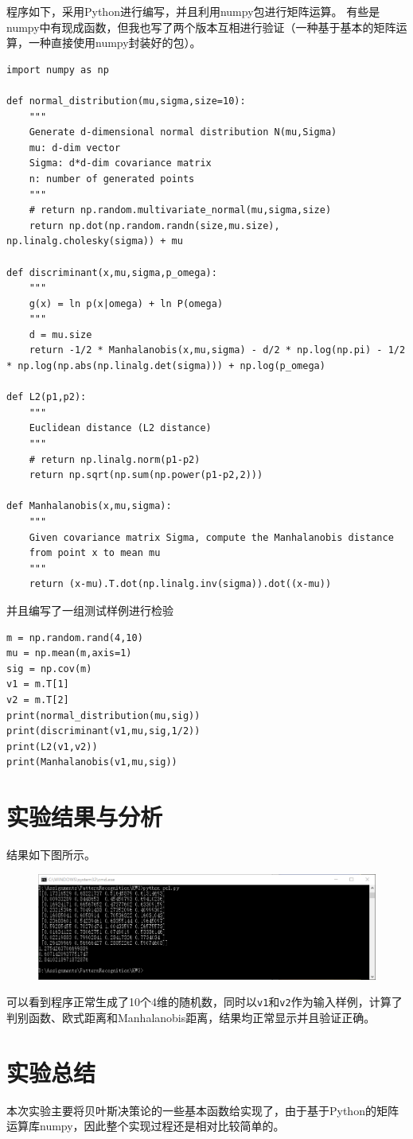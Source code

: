 \documentclass[reportComp]{thesis}
\begin{document}
程序如下，采用Python进行编写，并且利用numpy包进行矩阵运算。
有些是numpy中有现成函数，但我也写了两个版本互相进行验证（一种基于基本的矩阵运算，一种直接使用numpy封装好的包）。
\begin{lstlisting}
import numpy as np

def normal_distribution(mu,sigma,size=10):
	"""
	Generate d-dimensional normal distribution N(mu,Sigma)
	mu: d-dim vector
	Sigma: d*d-dim covariance matrix
	n: number of generated points
	"""
	# return np.random.multivariate_normal(mu,sigma,size)
	return np.dot(np.random.randn(size,mu.size), np.linalg.cholesky(sigma)) + mu

def discriminant(x,mu,sigma,p_omega):
	"""
	g(x) = ln p(x|omega) + ln P(omega)
	"""
	d = mu.size
	return -1/2 * Manhalanobis(x,mu,sigma) - d/2 * np.log(np.pi) - 1/2 * np.log(np.abs(np.linalg.det(sigma))) + np.log(p_omega)

def L2(p1,p2):
	"""
	Euclidean distance (L2 distance)
	"""
	# return np.linalg.norm(p1-p2)
	return np.sqrt(np.sum(np.power(p1-p2,2)))

def Manhalanobis(x,mu,sigma):
	"""
	Given covariance matrix Sigma, compute the Manhalanobis distance
	from point x to mean mu
	"""
	return (x-mu).T.dot(np.linalg.inv(sigma)).dot((x-mu))
\end{lstlisting}

并且编写了一组测试样例进行检验
\begin{lstlisting}
m = np.random.rand(4,10)
mu = np.mean(m,axis=1)
sig = np.cov(m)
v1 = m.T[1]
v2 = m.T[2]
print(normal_distribution(mu,sig))
print(discriminant(v1,mu,sig,1/2))
print(L2(v1,v2))
print(Manhalanobis(v1,mu,sig))
\end{lstlisting}

\section{实验结果与分析}
结果如下图所示。
\begin{figure}[H]
\centering
\includegraphics[width=\linewidth]{result.png}
\end{figure}
可以看到程序正常生成了10个4维的随机数，同时以\verb'v1'和\verb'v2'作为输入样例，计算了判别函数、欧式距离和Manhalanobis距离，结果均正常显示并且验证正确。

\section{实验总结}
本次实验主要将贝叶斯决策论的一些基本函数给实现了，由于基于Python的矩阵运算库numpy，因此整个实现过程还是相对比较简单的。
\end{document}

